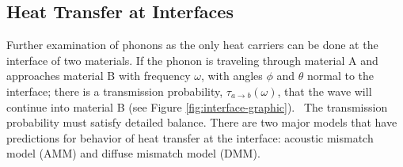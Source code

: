 \subsection{Heat Transfer at Interfaces}
Further examination of phonons as the only heat carriers can be done at the interface of two materials. If the phonon is traveling through material A and approaches material B with frequency $\omega$, with angles $\phi$ and $\theta$ normal to the interface; there is a transmission probability, $\tau_{a\rightarrow b}(\omega)$, that the wave will continue into material B (see Figure \ref{fig:interface-graphic}).~\cite{Monachon2016} 
The transmission probability must satisfy detailed balance.
There are two major models that have predictions for behavior of heat transfer at the interface: acoustic mismatch model (AMM) and diffuse mismatch model (DMM).~\cite{Monachon2016}
